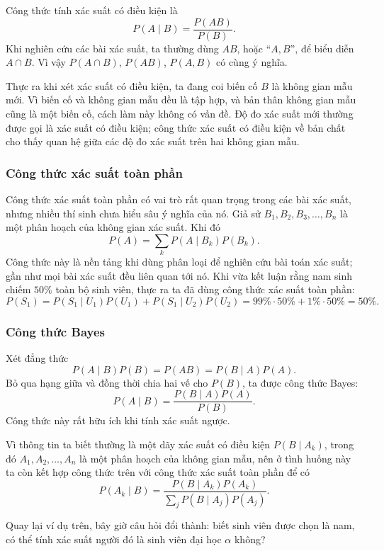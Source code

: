 \documentclass[11pt]{article}
\begin{document}
Công thức tính xác suất có điều kiện là
\[
  P(A\mid B)=\frac{P(AB)}{P(B)}.
\]
Khi nghiên cứu các bài xác suất, ta thường dùng \(AB\), hoặc ``\(A,B\)'', để
biểu diễn \(A\cap B\). Vì vậy \(P(A\cap B)\), \(P(AB)\), \(P(A,B)\) có cùng
ý nghĩa.

Thực ra khi xét xác suất có điều kiện, ta đang coi biến cố \(B\) là không
gian mẫu mới. Vì biến cố và không gian mẫu đều là tập hợp, và bản thân không
gian mẫu cũng là một biến cố, cách làm này không có vấn đề. Độ đo xác suất
mới thường được gọi là xác suất có điều kiện; công thức xác suất có điều
kiện về bản chất cho thấy quan hệ giữa các độ đo xác suất trên hai không
gian mẫu.

\subsubsection{Công thức xác suất toàn phần}

Công thức xác suất toàn phần có vai trò rất quan trọng trong các bài xác
suất, nhưng nhiều thí sinh chưa hiểu sâu ý nghĩa của nó. Giả sử
\(B_1,B_2,B_3,\ldots,B_n\) là một phân hoạch của không gian xác suất. Khi đó
\[
  P(A)=\sum_k P(A\mid B_k)P(B_k).
\]
Công thức này là nền tảng khi dùng phân loại để nghiên cứu bài toán xác
suất; gần như mọi bài xác suất đều liên quan tới nó. Khi vừa kết luận rằng
nam sinh chiếm \(50\%\) toàn bộ sinh viên, thực ra ta đã dùng công thức xác
suất toàn phần:
\[
  P(S_1)=P(S_1\mid U_1)P(U_1)+P(S_1\mid U_2)P(U_2)
  =99\%\cdot 50\%+1\%\cdot 50\%=50\%.
\]

\subsubsection{Công thức Bayes}

Xét đẳng thức
\[
  P(A\mid B)P(B)=P(AB)=P(B\mid A)P(A).
\]
Bỏ qua hạng giữa và đồng thời chia hai vế cho \(P(B)\), ta được công thức
Bayes:
\[
  P(A\mid B)=\frac{P(B\mid A)P(A)}{P(B)}.
\]
Công thức này rất hữu ích khi tính xác suất ngược.

Vì thông tin ta biết thường là một dãy xác suất có điều kiện \(P(B\mid A_k)\),
trong đó \(A_1,A_2,\ldots,A_n\) là một phân hoạch của không gian mẫu, nên ở
tình huống này ta còn kết hợp công thức trên với công thức xác suất toàn
phần để có
\[
  P(A_k\mid B)
  =
  \frac{P(B\mid A_k)P(A_k)}
       {\sum_j P(B\mid A_j)P(A_j)}.
\]

Quay lại ví dụ trên, bây giờ câu hỏi đổi thành: biết sinh viên được chọn là
nam, có thể tính xác suất người đó là sinh viên đại học \(\alpha\) không?
\end{document}
